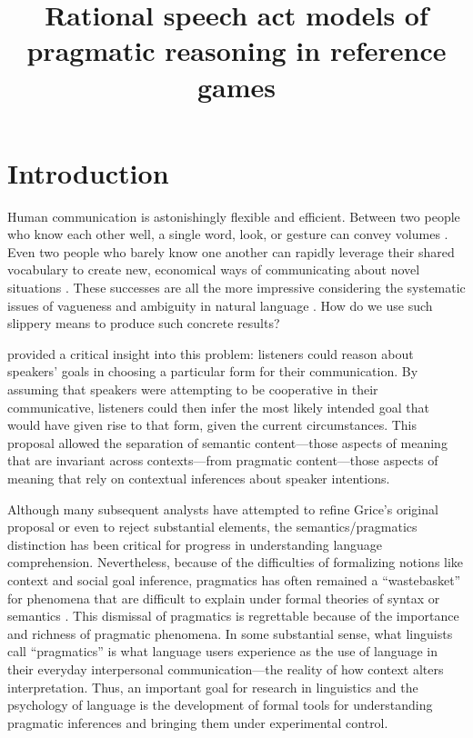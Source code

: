 \documentclass[man,noapacite]{apa2}
\title{Rational speech act models of pragmatic reasoning in reference games}
\begin{document}
\maketitle

\section{Introduction}

Human communication is astonishingly flexible and efficient. Between two people who know each other well, a single word, look, or gesture can convey volumes \cite{sperber1986,clark1996}. Even two people who barely know one another can rapidly leverage their shared vocabulary to create new, economical ways of communicating about novel situations \cite{brennan1996,clark1991}. These successes are all the more impressive considering the systematic issues of vagueness and ambiguity in natural language \cite{keefe1997,wasow2005}. How do we use such slippery means to produce such concrete results?

 provided a critical insight into this problem: listeners could reason about speakers' goals in choosing a particular form for their communication. By assuming that speakers were attempting to be cooperative in their communicative, listeners could then infer the most likely intended goal that would have given rise to that form, given the current circumstances. This proposal allowed the separation of semantic content---those aspects of meaning that are invariant across contexts---from pragmatic content---those aspects of meaning that rely on contextual inferences about speaker intentions.

Although many subsequent analysts have attempted to refine Grice's original proposal or even to reject substantial elements, the semantics/pragmatics distinction has been critical for progress in understanding language comprehension. Nevertheless, because of the difficulties of formalizing notions like context and social goal inference, pragmatics has often remained a ``wastebasket'' for phenomena that are difficult to explain under formal theories of syntax or semantics \cite{bar-hillel1971}. This dismissal of pragmatics is regrettable because of the importance and richness of pragmatic phenomena. In some substantial sense, what linguists call ``pragmatics'' is what language users experience as the use of language in their everyday interpersonal communication---the reality of how context alters interpretation. Thus, an important goal for research in linguistics and the psychology of language is the development of formal tools for understanding pragmatic inferences and bringing them under experimental control.
\end{document}
